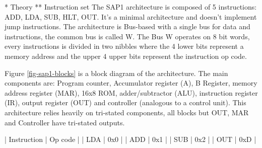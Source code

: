 * Theory
** Instruction set
The SAP1 architecture is composed of 5 instructions: ADD, LDA, SUB, HLT, OUT. It's a minimal architecture and doesn't implement jump instructions. The architecture is Bus-based with a single bus for data and instructions, the common bus is called W.
The Bus W operates on 8 bit words, every instructions is divided in two nibbles where the 4 lower bits represent a memory address and the upper 4 upper bits represent the instruction op code.

Figure \ref{fig-sap1-blocks} is a block diagram of the architecture. The main components are: Program counter, Accumulator register (A), B Register, memory address register (MAR), 16x8 ROM, adder/subtractor (ALU), instruction register (IR), output register (OUT) and controller (analogous to a control unit). This architecture relies heavily on tri-stated components, all blocks but OUT, MAR and Controller have tri-stated outputs.

| Instruction | Op code |
| LDA         |     0x0 |
| ADD         |     0x1 |
| SUB         |     0x2 |
| OUT         |     0xD |


